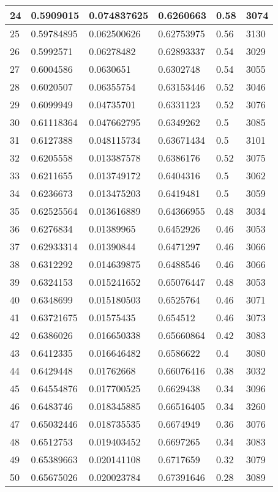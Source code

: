 \begin{longtable}{|l|l|l|l|l|l|}
24 & 0.5909015 & 0.074837625 & 0.6260663 & 0.58 & 3074 \\ \hline 
25 & 0.59784895 & 0.062500626 & 0.62753975 & 0.56 & 3130 \\ \hline 
26 & 0.5992571 & 0.06278482 & 0.62893337 & 0.54 & 3029 \\ \hline 
27 & 0.6004586 & 0.0630651 & 0.6302748 & 0.54 & 3055 \\ \hline 
28 & 0.6020507 & 0.06355754 & 0.63153446 & 0.52 & 3046 \\ \hline 
29 & 0.6099949 & 0.04735701 & 0.6331123 & 0.52 & 3076 \\ \hline 
30 & 0.61118364 & 0.047662795 & 0.6349262 & 0.5 & 3085 \\ \hline 
31 & 0.6127388 & 0.048115734 & 0.63671434 & 0.5 & 3101 \\ \hline 
32 & 0.6205558 & 0.013387578 & 0.6386176 & 0.52 & 3075 \\ \hline 
33 & 0.6211655 & 0.013749172 & 0.6404316 & 0.5 & 3062 \\ \hline 
34 & 0.6236673 & 0.013475203 & 0.6419481 & 0.5 & 3059 \\ \hline 
35 & 0.62525564 & 0.013616889 & 0.64366955 & 0.48 & 3034 \\ \hline 
36 & 0.6276834 & 0.01389965 & 0.6452926 & 0.46 & 3053 \\ \hline 
37 & 0.62933314 & 0.01390844 & 0.6471297 & 0.46 & 3066 \\ \hline 
38 & 0.6312292 & 0.014639875 & 0.6488546 & 0.46 & 3066 \\ \hline 
39 & 0.6324153 & 0.015241652 & 0.65076447 & 0.48 & 3053 \\ \hline 
40 & 0.6348699 & 0.015180503 & 0.6525764 & 0.46 & 3071 \\ \hline 
41 & 0.63721675 & 0.01575435 & 0.654512 & 0.46 & 3073 \\ \hline 
42 & 0.6386026 & 0.016650338 & 0.65660864 & 0.42 & 3083 \\ \hline 
43 & 0.6412335 & 0.016646482 & 0.6586622 & 0.4 & 3080 \\ \hline 
44 & 0.6429448 & 0.01762668 & 0.66076416 & 0.38 & 3032 \\ \hline 
45 & 0.64554876 & 0.017700525 & 0.6629438 & 0.34 & 3096 \\ \hline 
46 & 0.6483746 & 0.018345885 & 0.66516405 & 0.34 & 3260 \\ \hline 
47 & 0.65032446 & 0.018735535 & 0.6674949 & 0.36 & 3076 \\ \hline 
48 & 0.6512753 & 0.019403452 & 0.6697265 & 0.34 & 3083 \\ \hline 
49 & 0.65389663 & 0.020141108 & 0.6717659 & 0.32 & 3079 \\ \hline 
50 & 0.65675026 & 0.020023784 & 0.67391646 & 0.28 & 3089 \\ \hline 
\end{longtable}